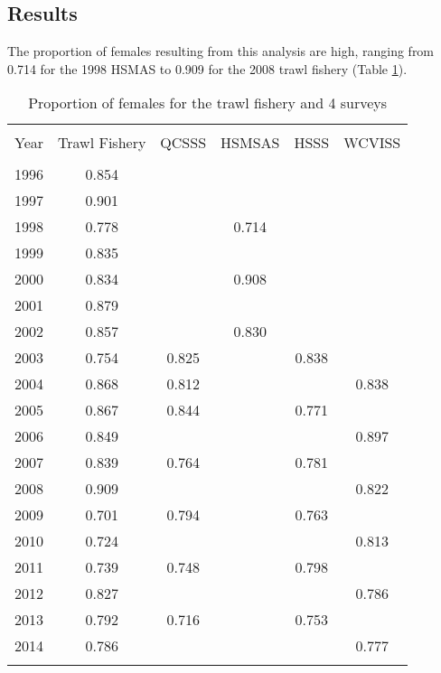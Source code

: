 \subsection{Results}
The proportion of females resulting from this analysis are high, ranging from 0.714 for the 1998 HSMAS to 0.909 for the 2008 trawl fishery (Table \ref{tab:propfemale}).
\clearpage
\begin{table}[h]
\centering
\caption{\label{tab:propfemale} Proportion of females for the trawl fishery and 4 surveys}
\begin{tabular}{lccccc}
\hline \\
Year & Trawl Fishery & QCSSS & HSMSAS & HSSS & WCVISS \\
\hline \\
1996 & 0.854 & & & & \\
1997 & 0.901 & & & & \\
1998 & 0.778 & & 0.714 & & \\
1999 & 0.835 & & & & \\
2000 & 0.834 & & 0.908 & & \\
2001 & 0.879 & & & & \\
2002 & 0.857 & & 0.830 & & \\

2003 & 0.754 & 0.825 & & 0.838 & \\
2004 & 0.868 & 0.812 & & & 0.838 \\
2005 & 0.867 & 0.844 & & 0.771 & \\
2006 & 0.849 & & & & 0.897 \\
2007 & 0.839 & 0.764 & & 0.781 & \\
2008 & 0.909 & & & & 0.822 \\
2009 & 0.701 & 0.794 & & 0.763 & \\
2010 & 0.724 & & & & 0.813 \\
2011 & 0.739 & 0.748 & & 0.798 & \\
2012 & 0.827 & & & & 0.786 \\
2013 & 0.792 & 0.716 & & 0.753 & \\
2014 & 0.786 & & & & 0.777 \\
\hline \\
\end{tabular}
\end{table}

\newpage

